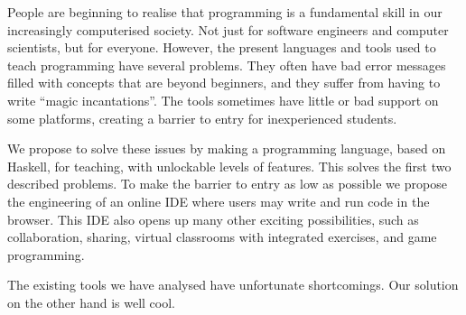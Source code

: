 People are beginning to realise that programming is a fundamental skill in our
increasingly computerised society.  Not just for software engineers and
computer scientists, but for everyone. However, the present languages and tools
used to teach programming have several problems. They often have bad error
messages filled with concepts that are beyond beginners, and they suffer from
having to write ``magic incantations''.  The tools sometimes have little or bad
support on some platforms, creating a barrier to entry for inexperienced
students.

We propose to solve these issues by making a programming language, based on
Haskell, for teaching, with unlockable levels of features. This solves the 
first two described problems. To make the barrier to entry as low as possible 
we propose the engineering of an online IDE where users may write and run code 
in the browser. This IDE also opens up many other exciting possibilities, such 
as collaboration, sharing, virtual classrooms with integrated exercises, and 
game programming.

The existing tools we have analysed have unfortunate shortcomings. Our 
solution on the other hand is well cool.
